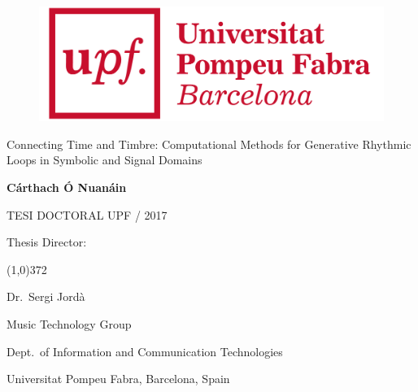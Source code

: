 
\newpage
\thispagestyle{empty}
\begin{titlingpage}
\begin{flushright}

  \begin{figure}[t]
    \begin{flushright}
	\includegraphics[scale=0.08]{ch00/figures/logo_upf_color.png}
    \end{flushright}
  \end{figure}

  \vspace*{2cm} 


  {\linespread{1.1} \huge \textsf{Connecting Time and Timbre:} \LARGE Computational Methods for Generative Rhythmic Loops in Symbolic and Signal Domains \par}
  
  \vspace*{2.5cm}

  \textbf{\large {Cárthach Ó Nuanáin}}
  
  \vspace*{\fill} 
  TESI DOCTORAL UPF / 2017

\end{flushright}
  
  \vspace*{2cm}

  Thesis Director:

  \vspace*{-0.25cm}

  \line(1,0){372}
  
  \vspace*{0.25cm}

  Dr.~Sergi Jordà
	
  Music Technology Group
  
  Dept.~of Information and Communication Technologies

  Universitat Pompeu Fabra, Barcelona, Spain
  
\end{titlingpage}


